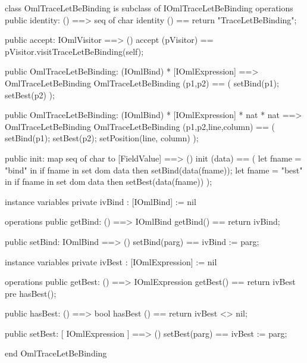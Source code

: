 \begin{vdm_al}
class OmlTraceLetBeBinding is subclass of IOmlTraceLetBeBinding
operations
  public identity: () ==> seq of char
  identity () == return "TraceLetBeBinding";

  public accept: IOmlVisitor ==> ()
  accept (pVisitor) == pVisitor.visitTraceLetBeBinding(self);

  public OmlTraceLetBeBinding:
    (IOmlBind) *
    [IOmlExpression] ==> OmlTraceLetBeBinding
  OmlTraceLetBeBinding (p1,p2) == 
    ( setBind(p1);
      setBest(p2) );

  public OmlTraceLetBeBinding:
    (IOmlBind) *
    [IOmlExpression] *
    nat *
    nat ==> OmlTraceLetBeBinding
  OmlTraceLetBeBinding (p1,p2,line,column) == 
    ( setBind(p1);
      setBest(p2);
      setPosition(line, column) );

  public init: map seq of char to [FieldValue] ==> ()
  init (data) ==
    ( let fname = "bind" in
        if fname in set dom data
        then setBind(data(fname));
      let fname = "best" in
        if fname in set dom data
        then setBest(data(fname)) );

instance variables
  private ivBind : [IOmlBind] := nil

operations
  public getBind: () ==> IOmlBind
  getBind() == return ivBind;

  public setBind: IOmlBind ==> ()
  setBind(parg) == ivBind := parg;

instance variables
  private ivBest : [IOmlExpression] := nil

operations
  public getBest: () ==> IOmlExpression
  getBest() == return ivBest
    pre hasBest();

  public hasBest: () ==> bool
  hasBest () == return ivBest <> nil;

  public setBest: [ IOmlExpression ] ==> ()
  setBest(parg) == ivBest := parg;

end OmlTraceLetBeBinding
\end{vdm_al}

